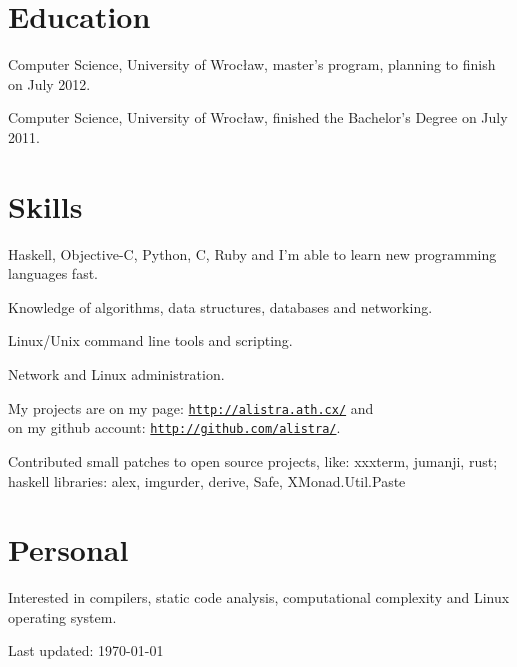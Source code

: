 \documentclass[letterpaper]{article}
\def\footerlink{}
\renewenvironment{itemize}{
  \begin{list}{}{
    \setlength{\leftmargin}{1.5em}
  }
}{
  \end{list}
}
\begin{document}
\section*{Education}

\begin{itemize}
  	\item Computer Science, University of Wrocław, master's program, planning to finish on July 2012.
  	\item Computer Science, University of Wrocław, finished the Bachelor's Degree on July 2011.
\end{itemize}

\section*{Skills}
\begin{itemize}
	\item Haskell, Objective-C, Python, C, Ruby and I'm able to learn new programming languages fast.
	\item Knowledge of algorithms, data structures, databases and networking.
	\item Linux/Unix command line tools and scripting.
	\item Network and Linux administration.
	\item My projects are on my page: \href{http://alistra.ath.cx/}{\tt http://alistra.ath.cx/} and \\
		 on my github account: \href{http://github.com/alistra/}{\tt http://github.com/alistra/}.
	\item Contributed small patches to open source projects, like: xxxterm, jumanji, rust;\\
		 haskell libraries: alex, imgurder, derive, Safe, XMonad.Util.Paste
\end{itemize}

\section*{Personal}

\begin{itemize}
	\item Interested in compilers, static code analysis, computational complexity and Linux operating system.
\end{itemize}

\bigskip

\begin{center}
  \begin{footnotesize}
    Last updated: \today \\
    \href{\footerlink}{\texttt{\footerlink}}
  \end{footnotesize}
\end{center}
\end{document}
